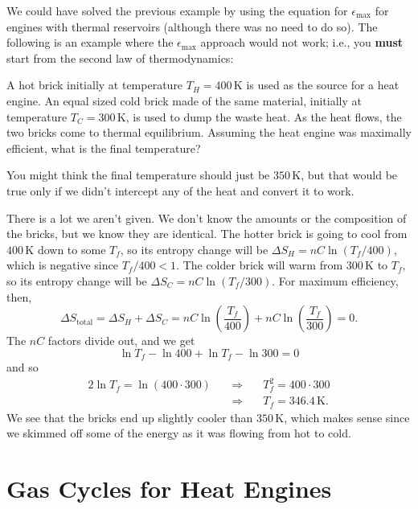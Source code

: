 We could have solved the previous example by using the equation for
$\epsilon_\text{max}$ for engines with thermal reservoirs (although 
there was no need to do so).  The following is an example where 
the $\epsilon_\text{max}$ approach would not work; i.e., you
\textbf{must} start from the second law of thermodynamics:
\begin{example}
  \label{example:two_brick_heat_engine}
  A hot brick initially at temperature $T_H=400\,\text{K}$ is used as
  the source for a heat engine.  An equal sized cold brick made of the
  same material, initially at temperature $T_C=300\,\text{K}$, is used
  to dump the waste heat.  As the heat flows, the two bricks come to
  thermal equilibrium.  Assuming the heat engine was maximally
  efficient, what is the final temperature?

  

\solution You might think the final temperature should just be
  $350\,\text{K}$, but that would be true only if we didn't intercept
  any of the heat and convert it to work.

  There is a lot we aren't given.  We don't know the amounts
  or the composition of the bricks, but we know they are identical.
  The hotter brick is going to cool from $400\,\text{K}$ down to some
  $T_f$, so its entropy change will be $\Delta S_H = nC\ln(T_f/400)$,
  which is negative since $T_f/400<1$.  The colder brick will warm
  from $300\,\text{K}$ to $T_f$, so its entropy change will be $\Delta
  S_C=nC\ln(T_f/300)$.  For maximum efficiency, then,
\begin{equation}
\Delta S_\text{total} = \Delta S_H+ \Delta S_C =
nC\ln\left(\frac{T_f}{400}\right) + nC\ln\left(\frac{T_f}{300}\right)
= 0.
\end{equation}
The $nC$ factors divide out, and we get
\begin{equation}
  \ln T_f - \ln 400 + \ln T_f - \ln 300 = 0
\end{equation}
and so
\begin{eqnarray}
2\ln T_f = \ln(400\cdot 300) \quad&\Rightarrow&\quad 
T_f^2=400\cdot 300   \\ 
      &\Rightarrow&\quad T_f = 346.4\,\text{K}. 
\end{eqnarray}
We see that the bricks end up slightly cooler than $350\,\text{K}$,
which makes sense since we skimmed off some of the energy as it was
flowing from hot to cold.
\end{example}

\section{Gas Cycles for Heat Engines}

